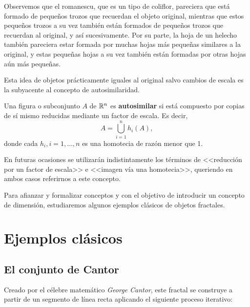 Observemos que el romanescu, que es un tipo de coliflor, pareciera que está formado de pequeños trozos que recuerdan el objeto original, mientras que estos pequeños trozos a su vez también están formados de pequeños trozos que recuerdan al original, y así sucesivamente. Por su parte, la hoja de un helecho también pareciera estar formada por muchas hojas más pequeñas similares a la original, y estas pequeñas hojas a su vez también están formadas por otras hojas aún más pequeñas.

Esta idea de objetos prácticamente iguales al original salvo cambios de escala es la subyacente al concepto de autosimilaridad.

\begin{definicion}[Autosimilaridad] Una figura o subconjunto $A$ de $\mathbb{R}^n$ es \textbf{autosimilar} si está compuesto por copias de sí mismo reducidas mediante un factor de escala. Es decir,
$$
A = \bigcup_{i=1}^n h_i(A),
$$
donde cada $h_i, i=1,\dots,n$ es una homotecia de razón menor que 1. 
\end{definicion}

En futuras ocasiones se utilizarán indistintamente los términos de <<reducción por un factor de escala>> e <<imagen vía una homotecia>>, queriendo en ambos casos referirnos a este concepto.

Para afianzar y formalizar conceptos y con el objetivo de introducir un concepto de dimensión, estudiaremos algunos ejemplos clásicos de objetos fractales.

\section{Ejemplos clásicos}
\label{section:ejemplos}

\subsection{El conjunto de Cantor}
\label{subsection:Cantor}

Creado por el célebre matemático \textit{George Cantor}, este fractal se construye a partir de un segmento de línea recta aplicando el siguiente proceso iterativo:

